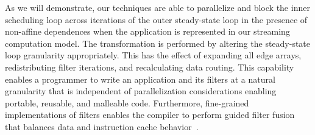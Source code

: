 As we will demonstrate, our techniques are able to parallelize and
block the inner scheduling loop across iterations of the outer
steady-state loop in the presence of non-affine dependences when the
application is represented in our streaming computation model.  The
transformation is performed by altering the steady-state loop
granularity appropriately.  This has the effect of expanding all edge
arrays, redistributing filter iterations, and recalculating data
routing.  This capability enables a programmer to write an application
and its filters at a natural granularity that is independent of
parallelization considerations enabling portable, reusable, and
malleable code.  Furthermore, fine-grained implementations of filters
enables the compiler to perform guided filter fusion that balances
data and instruction cache behavior~\cite{sermulins-lctes05}.  